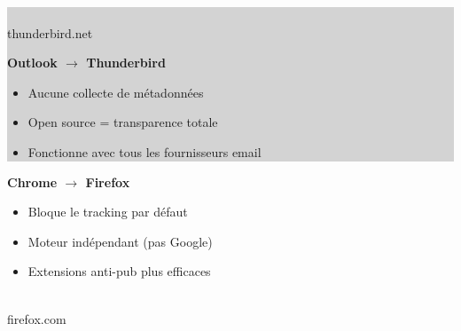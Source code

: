\documentclass[a0paper,portrait]{baposter}
\begin{document}
\begin{poster}
{  \vspace{0.5em}

  \noindent
  \colorbox{lightgray}{
    \begin{minipage}[t]{0.25\linewidth}
      \centering
      \\
      \small{thunderbird.net}
    \end{minipage}%
    \begin{minipage}[m]{0.7\linewidth}
      \textbf{\color{c4dtblue}Outlook $\rightarrow$ Thunderbird}
      \begin{itemize}
        \item Aucune collecte de métadonnées
        \item Open source = transparence totale
        \item Fonctionne avec tous les fournisseurs email
      \end{itemize}
    \end{minipage}
  }

  \vspace{0.5em}

  \noindent
  \begin{minipage}[m]{0.7\linewidth}
    \textbf{\color{c4dtblue}Chrome $\rightarrow$ Firefox}
    \begin{itemize}
      \item Bloque le tracking par défaut
      \item Moteur indépendant (pas Google)
      \item Extensions anti-pub plus efficaces
    \end{itemize}
  \end{minipage}%
  \begin{minipage}[t]{0.25\linewidth}
    \centering
    \\
    \small{firefox.com}
  \end{minipage}
}

\end{poster}
\end{document}
